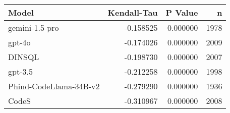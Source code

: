 \begin{tabular}{lrrr}
\toprule
Model & Kendall-Tau & P Value & n \\
\midrule
gemini-1.5-pro & -0.158525 & 0.000000 & 1978 \\
gpt-4o & -0.174026 & 0.000000 & 2009 \\
DINSQL & -0.198730 & 0.000000 & 2007 \\
gpt-3.5 & -0.212258 & 0.000000 & 1998 \\
Phind-CodeLlama-34B-v2 & -0.279290 & 0.000000 & 1936 \\
CodeS & -0.310967 & 0.000000 & 2008 \\
\bottomrule
\end{tabular}
